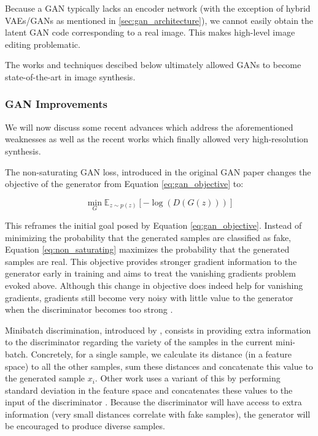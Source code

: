  Because a \ac{GAN} typically lacks an encoder network (with the exception of hybrid \ac{VAE}s/\ac{GAN}s
as mentioned in \ref{sec:gan_architecture}), we cannot easily obtain the latent \ac{GAN} code 
corresponding to a real image. This makes high-level image editing problematic. 

The works and techniques descibed below ultimately allowed \ac{GAN}s to become state-of-the-art in image synthesis.


\subsubsection{GAN Improvements}

We will now discuss some recent advances which address the aforementioned weaknesses as well as the 
recent works which finally allowed very high-resolution synthesis.

 The non-saturating GAN loss, introduced in the original \ac{GAN}
paper \citep{goodfellowgans} changes the objective of the 
generator from Equation \ref{eq:gan_objective} to:

\begin{equation}\label{eq:non_saturating}
      \min_G \mathbb{E}_{z \sim p(z)}[-\log(D(G(z)))]
\end{equation}

This reframes the initial goal posed by Equation \ref{eq:gan_objective}. Instead of minimizing the 
probability that the generated samples are 
classified as fake, Equation \ref{eq:non_saturating} maximizes the probability that the generated 
samples are real. This objective provides stronger gradient information to the generator early in 
training and aims to treat the vanishing gradients problem evoked above. Although this change in 
objective does indeed help for vanishing gradients, gradients still become very noisy with little
value to the generator when the discriminator becomes too strong \citep{arjovsky2017towards}.


Minibatch discrimination, introduced by \cite{improved_techniques_gans}, consists in providing 
extra information to the discriminator regarding the variety of the samples in the current mini-batch. 
Concretely, for a single sample, we calculate its distance (in a feature space) to all the other samples, 
 sum these distances and concatenate this value to the generated sample $x_i$. Other work uses a variant of 
 this by performing standard deviation in the feature space and concatenates these values to the input of 
 the discriminator \citep{karras2018progressive}. Because the discriminator will 
 have access to extra information (very small distances correlate with fake samples), the generator will 
 be encouraged to produce diverse samples. 

